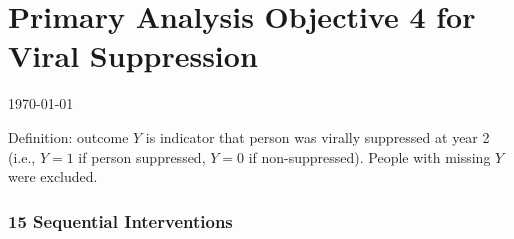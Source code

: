 \documentclass[11pt]{article}\usepackage[]{graphicx}\usepackage[]{color}
\begin{document}
\part*{Primary Analysis Objective 4 for Viral Suppression}
\today
\currenttime

Definition: outcome $Y$ is indicator that person was virally suppressed at year 2 (i.e., $Y = 1$ if person suppressed, $Y=0$ if non-suppressed). People with missing $Y$ were excluded. 







\section{15 Sequential Interventions}
\end{document}

